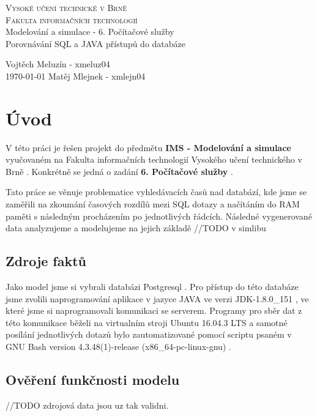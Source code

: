 \documentclass[a4paper, 11pt]{article}
\begin{document}
\thispagestyle{empty}
\begin{center}
\Huge
\textsc{Vysoké učení technické v Brně}\\
\huge
\textsc{Fakulta informačních technologií}\\
\LARGE
{}
Modelování a simulace - 6. Počítačové služby\\ \Huge Porovnávání SQL a JAVA přístupů do databáze
\end{center}

{
\LARGE \hfill
Vojtěch Meluzín - xmeluz04\\
\today \hfill
Matěj Mlejnek - xmlejn04}

\newpage
\thispagestyle{empty}

\tableofcontents

\newpage
\setcounter{page}{1}
\section{Úvod}
V této práci je řešen projekt do předmětu \textbf{IMS - Modelování a simulace} \cite{ims_web} vyučovaném na Fakulta informačních technologií Vysokého učení technického v Brně \cite{fit_web}. Konkrétně se jedná o zadání \textbf{6. Počítačové služby} \cite{zadani_web}.

Tato práce se věnuje problematice vyhledávacích časů nad databází, kde jsme se zaměřili na zkoumání časových rozdílů mezi SQL dotazy a načítáním do RAM paměti s následným procházením po jednotlivých řádcích. Následné vygenerované data analyzujeme a modelujeme na jejich základě //TODO v simlibu

\subsection{Zdroje faktů}
Jako model jsme si vybrali databázi Postgresql \cite{postgresql_web}. Pro přístup do této databáze jsme zvolili naprogramování aplikace v jazyce JAVA \cite{java_web} ve verzi JDK-1.8.0\_151 \cite{java_jdk_version}, ve které jsme si naprogramovali komunikaci se serverem. Programy pro sběr dat z této komunikace běželi na virtualním stroji Ubuntu 16.04.3 LTS \cite{ubuntu_web} a samotné posílání jednotlivých dotazů bylo zautomatizované pomocí scriptu psaném v GNU Bash version 4.3.48(1)-release (x86\_64-pc-linux-gnu) \cite{bash_web}.

\subsection{Ověření funkčnosti modelu}
//TODO zdrojová data jsou uz tak validni.
\end{document}
